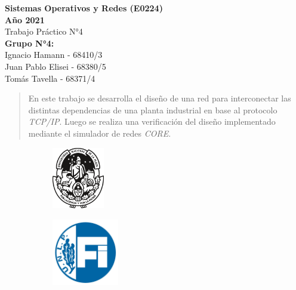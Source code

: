     \begin{titlepage}
        \begin{center}
            \vspace*{0.5cm}
            \huge
            \textbf{Sistemas Operativos y Redes (E0224) \\ Año 2021}    %
            \\
            \vspace{0.5cm}
            Trabajo Práctico N°4                                        %
            \\
            \vspace{2cm}
            \Large
            \textbf{Grupo N°4:}
            \\
            \large
            \vspace{0.2cm}
            Ignacio Hamann - 68410/3
            \\
            Juan Pablo Elisei - 68380/5
            \\
            Tomás Tavella - 68371/4
            \\
            \vspace{2cm}
            \begin{abstract}
                En este trabajo se desarrolla el diseño de una red para interconectar las distintas dependencias de una planta industrial en base al protocolo \textit{TCP/IP}. Luego se realiza una verificación del diseño implementado mediante el simulador de redes \textit{CORE}.
            \end{abstract}
            \vfill
            \begin{figure}[H]
                \centering
                \begin{subfigure}
                    \centering
                    \includegraphics[width=0.25\textwidth]{Imagenes/UNLP.pdf}
                \end{subfigure}
                \begin{subfigure}
                    \centering
                    \includegraphics[width=0.32\textwidth]{Imagenes/FI.jpg}

\end{subfigure}
\end{figure}
\end{center}
\end{titlepage}
